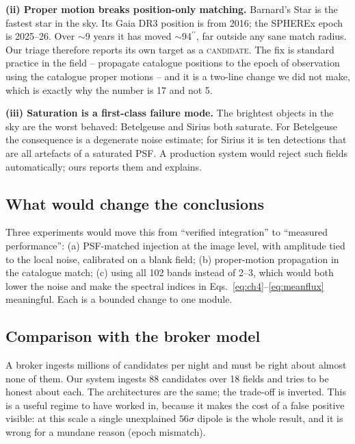 \documentclass[11pt,a4paper]{article}
\newcommand{\arcsec}{\ensuremath{{}^{\prime\prime}}}
\begin{document}
\textbf{(ii) Proper motion breaks position-only matching.} Barnard's Star is the fastest star in the
sky. Its Gaia DR3 position is from 2016; the SPHEREx epoch is 2025--26. Over $\sim$9 years it has moved
$\sim$94\arcsec, far outside any sane match radius. Our triage therefore reports its own target as a
\textsc{candidate}. The fix is standard practice in the field -- propagate catalogue positions to the
epoch of observation using the catalogue proper motions -- and it is a two-line change we did not make,
which is exactly why the number is 17 and not 5.

\textbf{(iii) Saturation is a first-class failure mode.} The brightest objects in the sky are the worst
behaved: Betelgeuse and Sirius both saturate. For Betelgeuse the consequence is a degenerate noise
estimate; for Sirius it is ten detections that are all artefacts of a saturated PSF. A production
system would reject such fields automatically; ours reports them and explains.

\subsection{What would change the conclusions}

Three experiments would move this from ``verified integration'' to ``measured performance'':
(a) PSF-matched injection at the image level, with amplitude tied to the local noise, calibrated on a
blank field; (b) proper-motion propagation in the catalogue match; (c) using all 102 bands instead of
2--3, which would both lower the noise and make the spectral indices in
Eqs.~\ref{eq:ch4}--\ref{eq:meanflux} meaningful. Each is a bounded change to one module.

\subsection{Comparison with the broker model}

A broker ingests millions of candidates per night and must be right about almost none of them. Our
system ingests 88 candidates over 18 fields and tries to be honest about each. The architectures are
the same; the trade-off is inverted. This is a useful regime to have worked in, because it makes the
cost of a false positive visible: at this scale a single unexplained $56\sigma$ dipole is the whole
result, and it is wrong for a mundane reason (epoch mismatch).

\end{document}

